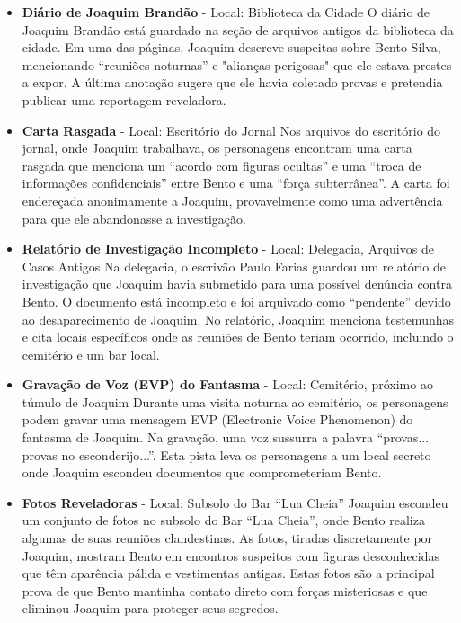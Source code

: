 \begin{itemize}
    \item \textbf{Diário de Joaquim Brandão} - Local: Biblioteca da Cidade  
    O diário de Joaquim Brandão está guardado na seção de arquivos antigos da biblioteca da cidade. Em uma das páginas, Joaquim descreve suspeitas sobre Bento Silva, mencionando “reuniões noturnas” e "alianças perigosas" que ele estava prestes a expor. A última anotação sugere que ele havia coletado provas e pretendia publicar uma reportagem reveladora.

    \item \textbf{Carta Rasgada} - Local: Escritório do Jornal  
    Nos arquivos do escritório do jornal, onde Joaquim trabalhava, os personagens encontram uma carta rasgada que menciona um “acordo com figuras ocultas” e uma “troca de informações confidenciais” entre Bento e uma “força subterrânea”. A carta foi endereçada anonimamente a Joaquim, provavelmente como uma advertência para que ele abandonasse a investigação.

    \item \textbf{Relatório de Investigação Incompleto} - Local: Delegacia, Arquivos de Casos Antigos  
    Na delegacia, o escrivão Paulo Farias guardou um relatório de investigação que Joaquim havia submetido para uma possível denúncia contra Bento. O documento está incompleto e foi arquivado como “pendente” devido ao desaparecimento de Joaquim. No relatório, Joaquim menciona testemunhas e cita locais específicos onde as reuniões de Bento teriam ocorrido, incluindo o cemitério e um bar local.

    \item \textbf{Gravação de Voz (EVP) do Fantasma} - Local: Cemitério, próximo ao túmulo de Joaquim  
    Durante uma visita noturna ao cemitério, os personagens podem gravar uma mensagem EVP (Electronic Voice Phenomenon) do fantasma de Joaquim. Na gravação, uma voz sussurra a palavra “provas... provas no esconderijo...”. Esta pista leva os personagens a um local secreto onde Joaquim escondeu documentos que comprometeriam Bento.

    \item \textbf{Fotos Reveladoras} - Local: Subsolo do Bar “Lua Cheia”  
    Joaquim escondeu um conjunto de fotos no subsolo do Bar “Lua Cheia”, onde Bento realiza algumas de suas reuniões clandestinas. As fotos, tiradas discretamente por Joaquim, mostram Bento em encontros suspeitos com figuras desconhecidas que têm aparência pálida e vestimentas antigas. Estas fotos são a principal prova de que Bento mantinha contato direto com forças misteriosas e que eliminou Joaquim para proteger seus segredos.


\end{itemize}
